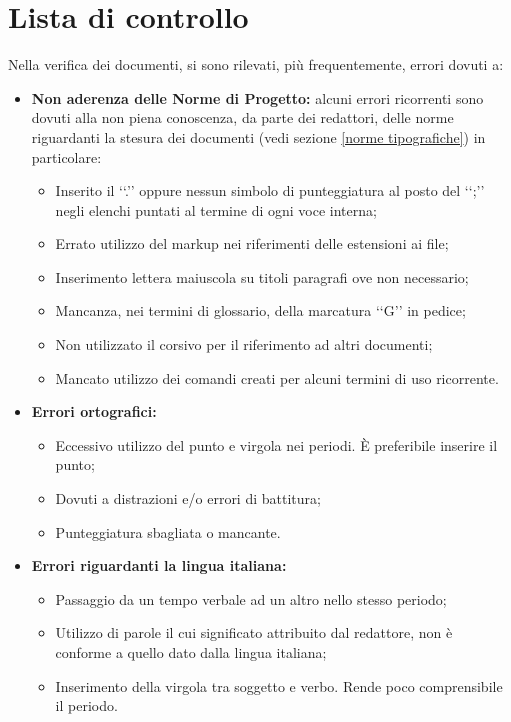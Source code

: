 \section{Lista di controllo}
\label{lista_di_controllo}
Nella verifica dei documenti, si sono rilevati, più frequentemente, errori dovuti a:
\begin{itemize}
\item \textbf{Non aderenza delle Norme di Progetto:} alcuni errori ricorrenti sono dovuti alla non piena conoscenza, da parte dei redattori, delle norme riguardanti la stesura dei documenti (vedi sezione \ref{norme tipografiche}) in particolare:
	\begin{itemize}
	\item Inserito il \lq\lq{.}\rq\rq{} oppure nessun simbolo di punteggiatura al posto del \lq\lq{;}\rq\rq{} negli elenchi puntati al termine di ogni voce interna;
	\item Errato utilizzo del markup nei riferimenti delle estensioni ai file;
	\item Inserimento lettera maiuscola su titoli paragrafi ove non necessario;
	\item Mancanza, nei termini di glossario, della marcatura \lq\lq{G}\rq\rq{} in pedice;
	\item Non utilizzato il corsivo per il riferimento ad altri documenti;
	\item Mancato utilizzo dei comandi creati per alcuni termini di uso ricorrente.
	\end{itemize}
\item \textbf{Errori ortografici:}
	\begin{itemize}
	\item Eccessivo utilizzo del punto e virgola nei periodi. \`E preferibile inserire il punto;
	\item Dovuti a distrazioni e/o errori di battitura;
	\item Punteggiatura sbagliata o mancante.
	\end{itemize}
\item \textbf{Errori riguardanti la lingua italiana:}
	\begin{itemize}
	\item Passaggio da un tempo verbale ad un altro nello stesso periodo;
	\item Utilizzo di parole il cui significato attribuito dal redattore, non è conforme a quello dato dalla lingua italiana;
	\item Inserimento della virgola tra soggetto e verbo. Rende poco comprensibile il periodo.

\end{itemize}
\end{itemize}
